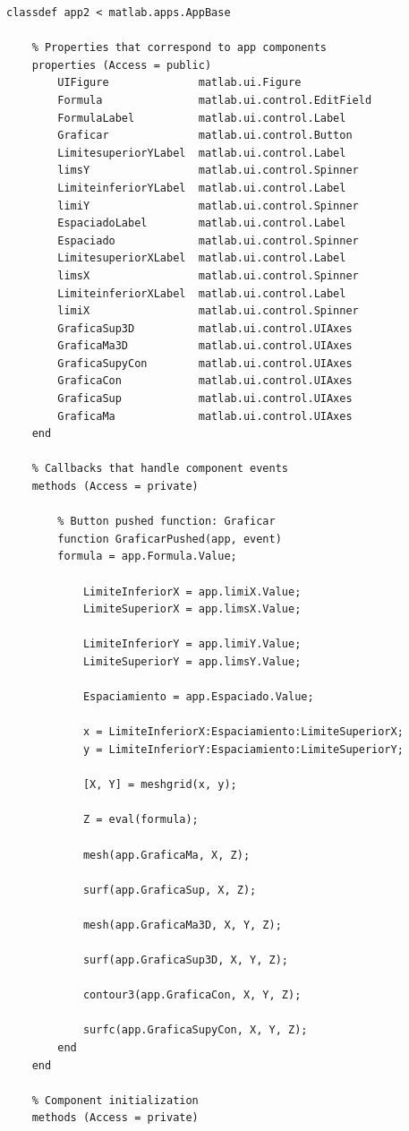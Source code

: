 \documentclass{article}
\begin{document}
	\begin{lstlisting}
classdef app2 < matlab.apps.AppBase

	% Properties that correspond to app components
	properties (Access = public)
		UIFigure              matlab.ui.Figure
		Formula               matlab.ui.control.EditField
		FormulaLabel          matlab.ui.control.Label
		Graficar              matlab.ui.control.Button
		LimitesuperiorYLabel  matlab.ui.control.Label
		limsY                 matlab.ui.control.Spinner
		LimiteinferiorYLabel  matlab.ui.control.Label
		limiY                 matlab.ui.control.Spinner
		EspaciadoLabel        matlab.ui.control.Label
		Espaciado             matlab.ui.control.Spinner
		LimitesuperiorXLabel  matlab.ui.control.Label
		limsX                 matlab.ui.control.Spinner
		LimiteinferiorXLabel  matlab.ui.control.Label
		limiX                 matlab.ui.control.Spinner
		GraficaSup3D          matlab.ui.control.UIAxes
		GraficaMa3D           matlab.ui.control.UIAxes
		GraficaSupyCon        matlab.ui.control.UIAxes
		GraficaCon            matlab.ui.control.UIAxes
		GraficaSup            matlab.ui.control.UIAxes
		GraficaMa             matlab.ui.control.UIAxes
	end
	
	% Callbacks that handle component events
	methods (Access = private)
		
		% Button pushed function: Graficar
		function GraficarPushed(app, event)
		formula = app.Formula.Value;
		
			LimiteInferiorX = app.limiX.Value;
			LimiteSuperiorX = app.limsX.Value;
			
			LimiteInferiorY = app.limiY.Value;
			LimiteSuperiorY = app.limsY.Value;
			
			Espaciamiento = app.Espaciado.Value;
			
			x = LimiteInferiorX:Espaciamiento:LimiteSuperiorX;
			y = LimiteInferiorY:Espaciamiento:LimiteSuperiorY;
			
			[X, Y] = meshgrid(x, y);
			
			Z = eval(formula);
			
			mesh(app.GraficaMa, X, Z);
			
			surf(app.GraficaSup, X, Z);
			
			mesh(app.GraficaMa3D, X, Y, Z);
			
			surf(app.GraficaSup3D, X, Y, Z);
			
			contour3(app.GraficaCon, X, Y, Z);
			
			surfc(app.GraficaSupyCon, X, Y, Z);
		end
	end
	
	% Component initialization
	methods (Access = private)
	

\end{lstlisting}
\end{document}
